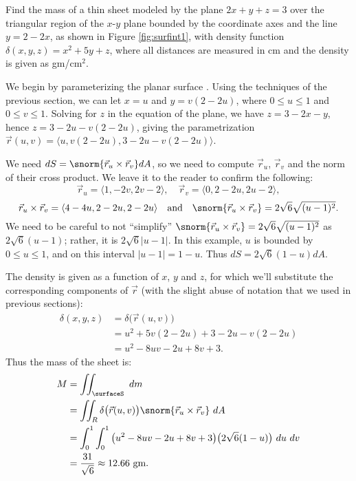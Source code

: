 {Find the mass of a thin sheet modeled by the plane $2x+y+z=3$ over the triangular region of the $x$-$y$ plane bounded by the coordinate axes and the line $y=2-2x$, as shown in Figure \ref{fig:surfint1}, with density function $\delta(x,y,z) = x^2+5y+z$, where all distances are measured in cm and the density is given as gm/cm$^2$. 
}
{We begin by parameterizing the planar surface \surfaceS. Using the techniques of the previous section, we can let $x=u$ and $y=v(2-2u)$, where $0\leq u\leq 1$ and $0\leq v\leq 1$. Solving for $z$ in the equation of the plane, we have $z=3-2x-y$, hence $z = 3-2u-v(2-2u)$, giving the parametrization
$\vec r(u,v) = \langle u, v(2-2u), 3-2u-v(2-2u)\rangle$.


We need $dS=\snorm{\vec r_u\times \vec r_v}dA$, so we need to compute $\vec r_u$, $\vec r_v$ and the norm of their cross product. We leave it to the reader to confirm the following:
$$\vec r_u = \langle 1,-2v,2v-2\rangle,\quad \vec r_v = \langle 0,2-2u, 2u-2\rangle,$$
$$\vec r_u\times \vec r_v = \langle 4-4u,2-2u,2-2u\rangle\quad \text{and}\quad \snorm{\vec r_u\times \vec r_v} = 2\sqrt{6}\sqrt{(u-1)^2}.$$
We need to be careful to not ``simplify'' $\snorm{\vec r_u\times \vec r_v} = 2\sqrt{6}\sqrt{(u-1)^2}$ as $2\sqrt{6}(u-1)$; rather, it is $2\sqrt{6}|u-1|$. In this example, $u$ is bounded by $0\leq u\leq 1$, and on this interval $|u-1| = 1-u$. Thus $dS = 2\sqrt{6}(1-u)dA$. 

The density is given as a function of $x$, $y$ and $z$, for which we'll substitute the corresponding components of $\vec r$ (with the slight abuse of notation that we used in previous sections): 
\begin{align*}
\delta(x,y,z) &= \delta\big(\vec r(u,v)\big) \\
			&= u^2 + 5v(2-2u)+3-2u-v(2-2u)\\
			&= u^2-8uv-2u+8v+3.
\end{align*}
Thus the mass of the sheet is:
\begin{align*}
M &= \iint_\surfaceS\ dm\\
	&= \iint_R \delta\big(\vec r(u,v)\big)\snorm{\vec r_u\times \vec r_v}\ dA\\
	&= \int_0^1\int_0^1 \big(u^2-8uv-2u+8v+3\big)\big(2\sqrt{6}(1-u)\big)\ du\ dv\\
	&= \frac{31}{\sqrt{6}} \approx 12.66 \text{ gm.}
\end{align*}
}\\

